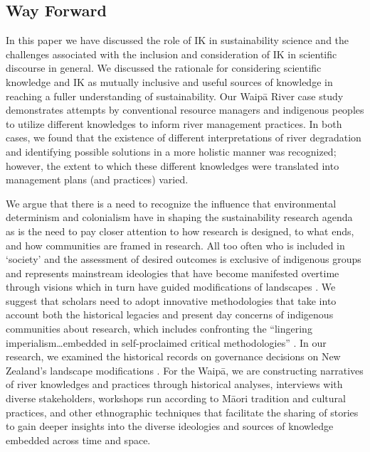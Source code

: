 \documentclass[10pt,a4paper]{article}
\begin{document}
\begin{multicols}{2}



\section{Way Forward}
\noindent In this paper we have discussed the role of IK in sustainability science and the challenges associated with the inclusion and consideration of IK in scientific discourse in general. We discussed the rationale for considering scientific knowledge and IK as mutually inclusive and useful sources of knowledge in reaching a fuller understanding of sustainability. Our Waip\={a} River case study demonstrates attempts by conventional resource managers and indigenous peoples to utilize different knowledges to inform river management practices. In both cases, we found that the existence of different interpretations of river degradation and identifying possible solutions in a more holistic manner was recognized; however, the extent to which these different knowledges were translated into management plans (and practices) varied.

We argue that there is a need to recognize the influence that environmental determinism and colonialism have in shaping the sustainability research agenda as is the need to pay closer attention
to how research is designed, to what ends, and how communities are framed in research. All too often who is included in ‘society’ and the assessment of desired outcomes is exclusive of indigenous groups and represents mainstream ideologies that have become manifested overtime through visions which in turn have guided modifications of landscapes \citep{r44}. We suggest that scholars need to adopt innovative methodologies that take into account both the historical legacies and present day concerns of indigenous communities about research, which includes confronting the ``lingering imperialism\ldots embedded in self-proclaimed critical methodologies'' \citep{r26}. In our research, we examined the historical records on governance decisions on New Zealand’s landscape modifications \citep{r44}. For the Waip\={a}, we are constructing narratives of river knowledges and practices through historical analyses, interviews with diverse stakeholders, workshops run according to M\={a}ori tradition and cultural practices, and other ethnographic techniques that facilitate the sharing of stories to gain deeper insights into the diverse ideologies and sources of knowledge embedded across time and space.


\end{multicols}
\end{document}
